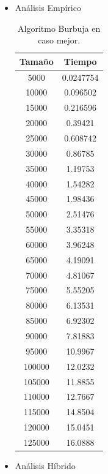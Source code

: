 \documentclass[a4paper,12pt,twoside]{article} %
\begin{document}
		\begin{itemize}
		
		\item Análisis Empírico
		\begin{table}[h]
	\begin{center}
		\begin{tabular}{|c|c|}
		\hline
		Tamaño & Tiempo \\
		\hline
    		5000 & 0.0247754 \\
    		10000 & 0.096502 \\
    		15000 & 0.216596 \\
    		20000 & 0.39421 \\
    		25000 & 0.608742 \\
    		30000 & 0.86785 \\
    		35000 & 1.19753 \\
    		40000 & 1.54282 \\
    		45000 & 1.98436 \\
    		50000 & 2.51476 \\
    		55000 & 3.35318 \\
    		60000 & 3.96248 \\
    		65000 & 4.19091 \\
    		70000 & 4.81067 \\
    		75000 & 5.55205 \\
    		80000 & 6.13531 \\
    		85000 & 6.92302 \\
    		90000 & 7.81883 \\
    		95000 & 10.9967 \\
    		100000 & 12.0232 \\
    		105000 & 11.8855 \\
    		110000 & 12.7667 \\
    		115000 & 14.8504 \\
    		120000 & 15.0451 \\
    		125000 & 16.0888 \\
		\hline
		\end{tabular}
	\end{center}
	\caption{Algoritmo Burbuja en caso mejor.}
\end{table}
\newpage
		
		\item Análisis Híbrido
		
\begin{figure}[h]
  \begin{center}
  

\end{center}
\end{figure}
\end{itemize}
\end{document}

